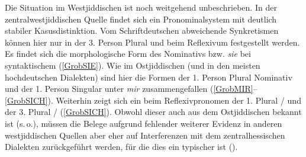 Die Situation im Westjiddischen ist noch weitgehend unbeschrieben. In der zentralwestjiddischen Quelle  findet sich ein Pronominalsystem mit deutlich stabiler Kasusdistinktion. Vom Schriftdeutschen abweichende Synkretismen können hier nur in der 3. Person Plural und beim Reflexivum festgestellt werden. Es findet sich die morphologische Form des Nominativs bzw.   \textit{sie} bei syntaktischem  (\ref{GrobSIE}). Wie im Ostjiddischen (und in den meisten hochdeutschen Dialekten) sind hier die Formen der 1. Person Plural Nominativ und der 1. Person Singular  unter \textit{mir} zusammengefallen (\ref{GrobMIR}–\ref{GrobSICH}). Weiterhin zeigt sich ein  beim Reflexivpronomen der 1. Plural / und der 3. Plural /  (\ref{GrobSICH}). Obwohl dieser  auch aus dem Ostjiddischen bekannt ist (s.\,o.), müssen die Belege aufgrund fehlender weiterer Evidenz in anderen westjiddischen Quellen aber eher auf Interferenzen mit dem zentralhessischen Dialekten zurückgeführt werden, für die dies ein typischer  ist (\citealt[29]{Kehrein1860}). 


   
